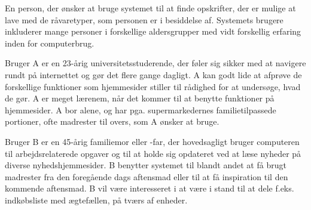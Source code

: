 {En person, der ønsker at bruge systemet \Foodl{} til at finde opskrifter, der er mulige at lave med de råvaretyper, som personen er i besiddelse af.}
{Systemets brugere inkluderer mange personer i forskellige aldersgrupper med vidt forskellig erfaring inden for computerbrug.}
{Bruger A er en 23-årig universitetsstuderende, der føler sig sikker med at navigere rundt på internettet og gør det flere gange dagligt. A kan godt lide at afprøve de forskellige funktioner som hjemmesider stiller til rådighed for at undersøge, hvad de gør. A er meget lærenem, når det kommer til at benytte funktioner på hjemmesider. A bor alene, og har pga. supermarkedernes familietilpassede portioner, ofte madrester til overs, som A ønsker at bruge. 

Bruger B er en 45-årig familiemor eller -far, der hovedsagligt bruger computeren til arbejdsrelaterede opgaver og til at holde sig opdateret ved at læse nyheder på diverse nyhedshjemmesider.  B benytter systemet til blandt andet at få brugt madrester fra den foregående dags aftensmad eller til at få inspiration til den kommende aftensmad. B vil være interesseret i at være i stand til at dele f.eks. indkøbsliste med ægtefællen, på tværs af enheder.}
{}
